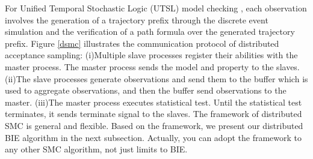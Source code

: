 For Unified Temporal Stochastic Logic (UTSL) model checking \cite{Younes2004Planning}, each observation involves the generation of a trajectory prefix through the discrete event simulation and the verification of a path formula over the generated trajectory prefix. Figure \ref{dsmc} illustrates the communication protocol of distributed acceptance sampling: (i)Multiple slave processes register their abilities with the master process. The master process sends the model and property to the slaves. (ii)The slave processes generate observations and send them to the buffer which is used to aggregate observations, and then the buffer send observations to the master. (iii)The master process executes statistical test. Until the statistical test terminates, it sends terminate signal to the slaves. The framework of distributed SMC is general and flexible. Based on the framework, we present our distributed BIE algorithm in the next subsection. Actually, you can adopt the framework to any other SMC algorithm, not just limits to BIE.
